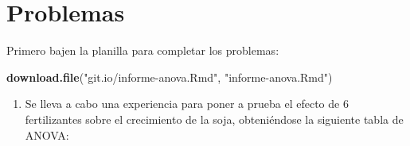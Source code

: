 \documentclass[]{book}
\newenvironment{Shaded}{\begin{snugshade}}{\end{snugshade}}
\newcommand{\KeywordTok}[1]{\textcolor[rgb]{0.13,0.29,0.53}{\textbf{#1}}}
\newcommand{\NormalTok}[1]{#1}
\newcommand{\StringTok}[1]{\textcolor[rgb]{0.31,0.60,0.02}{#1}}
\providecommand{\tightlist}{%
  \setlength{\itemsep}{0pt}\setlength{\parskip}{0pt}}
\theoremstyle{definition}
\theoremstyle{definition}
\theoremstyle{definition}
\theoremstyle{remark}
\begin{document}
\hypertarget{problemas}{%
\section{Problemas}\label{problemas}}

Primero bajen la planilla para completar los problemas:

\begin{Shaded}
\begin{Highlighting}[]
\KeywordTok{download.file}\NormalTok{(}\StringTok{"git.io/informe-anova.Rmd"}\NormalTok{, }\StringTok{"informe-anova.Rmd"}\NormalTok{)}
\end{Highlighting}
\end{Shaded}

\begin{enumerate}
\def\labelenumi{\arabic{enumi}.}
\tightlist
\item
  Se lleva a cabo una experiencia para poner a prueba el efecto de 6
  fertilizantes sobre el crecimiento de la soja, obteniéndose la
  siguiente tabla de ANOVA:
\end{enumerate}
\end{document}
